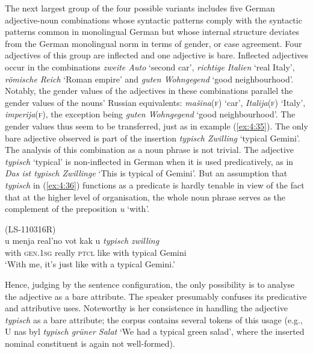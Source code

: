 The next largest group of the four possible variants includes five German adjective-noun combinations whose syntactic patterns comply with the syntactic patterns common in monolingual German but whose internal structure deviates from the German monolingual norm in terms of gender, or case agreement. Four adjectives of this group are inflected and one adjective is bare. Inflected adjectives occur in the combinations \textit{zweite Auto} `second car', \textit{richtige Italien} `real Italy', \textit{römische Reich} `Roman empire' and \textit{guten Wohngegend} `good neighbourhood'. Notably, the gender values of the adjectives in these combinations parallel the gender values of the nouns' Russian equivalents: \textit{mašina}(\textsc{f}) `car', \textit{Italija}(\textsc{f}) `Italy', \textit{imperija}(\textsc{f}), the exception being \textit{guten Wohngegend} `good neighbourhood'. The gender values thus seem to be transferred, just as in example (\ref{ex:4:35}). The only bare adjective observed is part of the insertion \textit{typisch Zwilling} `typical Gemini'. The analysis of this combination as a noun phrase is not trivial. The adjective \textit{typisch} `typical' is non-inflected in German when it is used predicatively, as in \textit{Das ist typisch Zwillinge} `This is typical of Gemini'. But an assumption that \textit{typisch} in (\ref{ex:4:36}) functions as a predicate is hardly tenable in view of the fact that at the higher level of organisation, the whole noun phrase serves as the complement of the preposition \textit{u} `with'. 

\ea
\label{ex:4:36}
(LS-110316R)\\
 \gll u menja real'no vot kak u \textit{typisch} \textit{zwilling}\\
	with \textsc{gen.1sg} really \textsc{ptcl} like with typical Gemini\\
\glt `With me, it's just like with a typical Gemini.'
\z

\noindent  Hence, judging by the sentence configuration, the only possibility is to analyse the adjective as a bare attribute. The speaker presumably confuses its predicative and attributive uses. Noteworthy is her consistence in handling the adjective \textit{typisch} as a bare attribute; the corpus contains several tokens of this usage (e.g., U nas byl \textit{typisch grüner Salat} `We had a typical green salad', where the inserted nominal constituent is again not well-formed).

